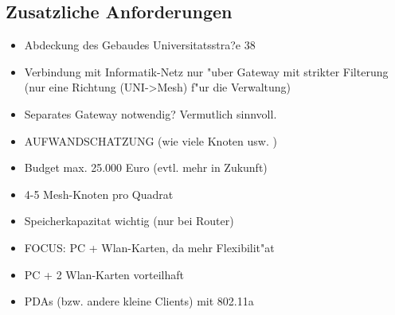 \subsection{Zusatzliche Anforderungen}
\begin{itemize}
	\item Abdeckung des Gebaudes Universitatsstra?e 38
	\item Verbindung mit Informatik-Netz nur "uber Gateway mit strikter Filterung
	      (nur eine Richtung (UNI->Mesh) f"ur die Verwaltung)
	\item Separates Gateway notwendig? Vermutlich sinnvoll. 
	\item AUFWANDSCHATZUNG (wie viele Knoten usw. )
	\item Budget max. 25.000 Euro (evtl. mehr in Zukunft)
	\item 4-5 Mesh-Knoten pro Quadrat 
	\item Speicherkapazitat wichtig (nur bei Router)
	\item FOCUS: PC + Wlan-Karten, da mehr Flexibilit"at
	\item PC + 2 Wlan-Karten vorteilhaft
	\item PDAs (bzw. andere kleine Clients) mit 802.11a
\end{itemize}


